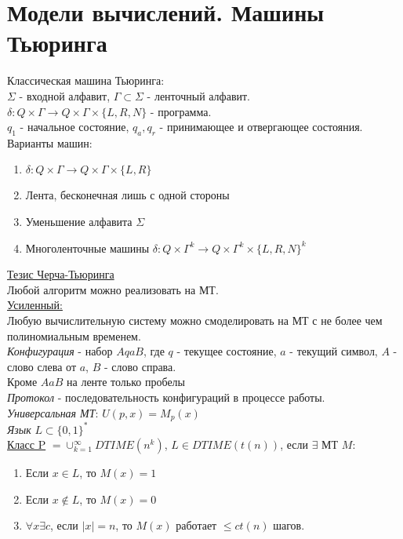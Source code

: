 \documentclass{article}
\begin{document}
 
	\section{Модели вычислений. Машины Тьюринга}
	Классическая машина Тьюринга:\\
	$\Sigma$ - входной алфавит, $\Gamma \subset \Sigma$ - ленточный алфавит.\\
	$\delta: Q\times\Gamma \to Q\times\Gamma\times\{L,R,N\}$ - программа.\\
	$q_1$ - начальное состояние,  $q_a, q_r$ - принимающее и отвергающее состояния.\\
	
	Варианты машин:
	\begin{enumerate}
		\item $\delta: Q\times\Gamma \to Q\times\Gamma\times\{L,R\}$
		\item Лента, бесконечная лишь с одной стороны
		\item Уменьшение алфавита $\Sigma$
		\item  Многоленточные машины $\delta:Q\times\Gamma^k \to Q\times\Gamma^k\times \{L,R,N\}^k$
	\end{enumerate} 
	\underline{Тезис Черча-Тьюринга}\\Любой алгоритм можно реализовать на МТ.\\
	\underline{Усиленный:}\\Любую вычислительную систему можно смоделировать на МТ с не более чем полиномиальным временем.\\
	\emph{Конфигурация} - набор $AqaB$, 
	где $q$ - текущее состояние, $a$ - текущий символ, $A$ - слово слева от $a$, $B$ - слово справа.\\ Кроме $AaB$ на ленте только пробелы \\
	\emph{Протокол} - последовательность конфигураций в процессе работы.\\
	\emph{Универсальная МТ}: $U(p,x) = M_p(x)$\\
	\emph{Язык} $L \subset \{0,1\}^*$\\
	
	
	\underline{Класс P} $ = \cup_{k=1}^{\infty}DTIME(n^k)$,	$L \in DTIME(t(n))$, если $\exists$ МТ $M$:
	\begin{enumerate}
		\item Если $x\in L$, то  $M(x)=1$
		\item Если $x \not\in L$, то $M(x)=0$
		\item $\forall x \exists c$, если $|x|=n$, то  $M(x)$ работает $\le ct(n)$ шагов.\\
	\end{enumerate}
	
\end{document}
